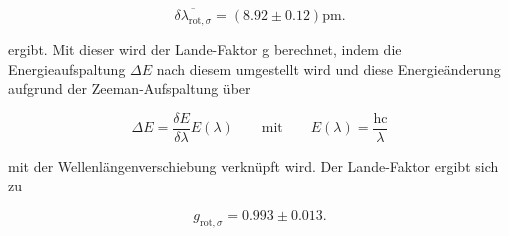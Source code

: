             \begin{equation*}
                \overline{\delta \lambda_{\text{rot}, \sigma}} = \left(8.92 \pm 0.12\right)\si{\pico\metre}.
            \end{equation*}

            ergibt. Mit dieser wird der Lande-Faktor g berechnet, indem die Energieaufspaltung $\Delta E$ nach diesem umgestellt wird und diese Energieänderung aufgrund der Zeeman-Aufspaltung über 

            \begin{equation*}
                \Delta E = \frac{\delta E}{\delta \lambda} E(\lambda) \qquad \text{mit} \qquad E(\lambda) = \frac{\text{hc}}{\lambda}
            \end{equation*}

            mit der Wellenlängenverschiebung verknüpft wird. Der Lande-Faktor ergibt sich zu

            \begin{equation*}
                g_{\text{rot}, \sigma} = 0.993 \pm 0.013 .
            \end{equation*}


